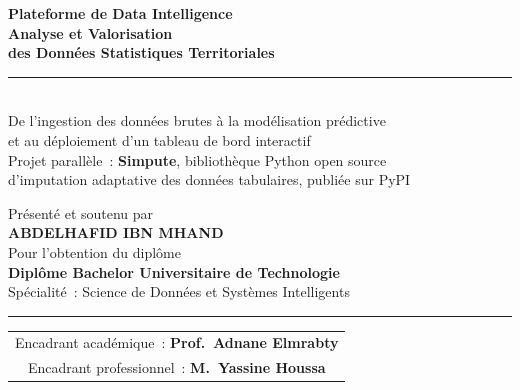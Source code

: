 \documentclass[12pt,a4paper]{report}
\begin{document}
\begin{titlepage}
\begin{center}
  \begin{tcolorbox}[
    enhanced,
    colback=hcplight,
    colframe=hcpblue,
    arc=5pt,
    boxrule=1pt,
    left=14pt, right=14pt, top=12pt, bottom=12pt,
    width=0.92\textwidth,
    halign=center,
    drop fuzzy shadow
  ]
    {\sffamily\LARGE\bfseries\color{hcpblue}
      Plateforme de Data Intelligence}\\[6pt]
    {\sffamily\Large\bfseries\color{hcpdark}
      Analyse et Valorisation\\
      des Donn\'ees Statistiques Territoriales}\\[8pt]
    {\color{hcpblue!40}\rule{0.62\linewidth}{0.45pt}}\\[6pt]
    {\sffamily\normalsize\color{hcpdark}
      De l'ingestion des donn\'ees brutes \`a la mod\'elisation pr\'edictive\\
      et au d\'eploiement d'un tableau de bord interactif}\\[6pt]
    {\sffamily\footnotesize\color{hcpaccent}
      Projet parall\`ele~: \textbf{Simpute}, biblioth\`eque Python open source\\
      d'imputation adaptative des donn\'ees tabulaires, publi\'ee sur PyPI}
  \end{tcolorbox}
\end{center}

\begin{center}
  {\sffamily\small\color{hcpgray} Pr\'esent\'e et soutenu par}\\[5pt]
  {\sffamily\LARGE\bfseries\color{hcpdark} ABDELHAFID IBN MHAND}\\[8pt]
  {\sffamily\small\color{hcpgray} Pour l'obtention du dipl\^ome}\\[4pt]
  {\sffamily\large\bfseries\color{hcpblue}
    Dipl\^ome Bachelor Universitaire de Technologie}\\[3pt]
  {\sffamily\normalsize\color{hcpgray}
    Sp\'ecialit\'e~: Science de Donn\'ees et Syst\`emes Intelligents}
\end{center}

{\color{hcpblue!45}\noindent\rule{\textwidth}{0.4pt}}
\begin{center}
  \begin{tabular}{@{}c@{}}
    {\sffamily\small\color{hcpgray} Encadrant acad\'emique~: \textbf{\color{hcpdark}Prof.\ Adnane Elmrabty}}\\[1pt]
    {\sffamily\small\color{hcpgray} Encadrant professionnel~: \textbf{\color{hcpdark}M.\ Yassine Houssa}}\\[10pt]
    

\end{tabular}
\end{center}
\end{titlepage}
\end{document}
